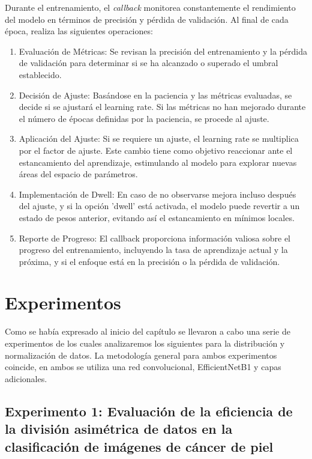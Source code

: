 Durante el entrenamiento, el \textit{callback} monitorea constantemente el rendimiento del modelo en términos de precisión y pérdida de validación. Al final de cada época, realiza las siguientes operaciones:

\begin{enumerate}
   \item Evaluación de Métricas: Se revisan la precisión del entrenamiento y la pérdida de validación para determinar si se ha alcanzado o superado el umbral establecido.
   \item Decisión de Ajuste: Basándose en la paciencia y las métricas evaluadas, se decide si se ajustará el learning rate. Si las métricas no han mejorado durante el número de épocas definidas por la paciencia, se procede al ajuste.
   \item Aplicación del Ajuste: Si se requiere un ajuste, el learning rate se multiplica por el factor de ajuste. Este cambio tiene como objetivo reaccionar ante el estancamiento del aprendizaje, estimulando al modelo para explorar nuevas áreas del espacio de parámetros.
   \item Implementación de Dwell: En caso de no observarse mejora incluso después del ajuste, y si la opción 'dwell' está activada, el modelo puede revertir a un estado de pesos anterior, evitando así el estancamiento en mínimos locales.
   \item Reporte de Progreso: El callback proporciona información valiosa sobre el progreso del entrenamiento, incluyendo la tasa de aprendizaje actual y la próxima, y si el enfoque está en la precisión o la pérdida de validación.
\end{enumerate}

\section{Experimentos}

Como se había expresado al inicio del capítulo se llevaron a cabo una serie de experimentos de los cuales analizaremos los siguientes para la distribución y normalización de datos. La metodología general para ambos experimentos coincide, en ambos se utiliza una red convolucional, EfficientNetB1 y capas adicionales.

\subsection{Experimento 1: Evaluación de la eficiencia de la división asimétrica de datos en la clasificación de imágenes de cáncer de piel}

